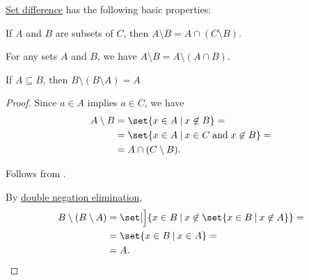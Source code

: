 \begin{proposition}\label{thm:set_difference}
  \hyperref[def:basic_set_operations/difference]{Set difference} has the following basic properties:
  \begin{thmenum}
     If \( A \) and \( B \) are subsets of \( C \), then \( A \setminus B = A \cap (C \setminus B) \).

     For any sets \( A \) and \( B \), we have \( A \setminus B = A \setminus (A \cap B) \).

     If \( A \subseteq B \), then \( B \setminus (B \setminus A) = A \)
  \end{thmenum}
\end{proposition}
\begin{proof}
   Since \( a \in A \) implies \( a \in C \), we have
  \begin{align*}
    A \setminus B
    &=
    \set{ x \in A \given x \not\in B }
    = \\ &=
    \set{ x \in A \given x \in C \T{and} x \not\in B }
    = \\ &=
    A \cap (C \setminus B).
  \end{align*}

   Follows from .

   By \hyperref[thm:minimal_propositional_negation_laws/dne]{double negation elimination},
  \begin{align*}
    B \setminus (B \setminus A)
    &=
    \set[\Big]{ x \in B \given x \not\in \set{ x \in B \given x \not\in A } }
    = \\ &=
    \set{ x \in B \given x \in A }
    = \\ &=
    A.
  \end{align*}
\end{proof}

